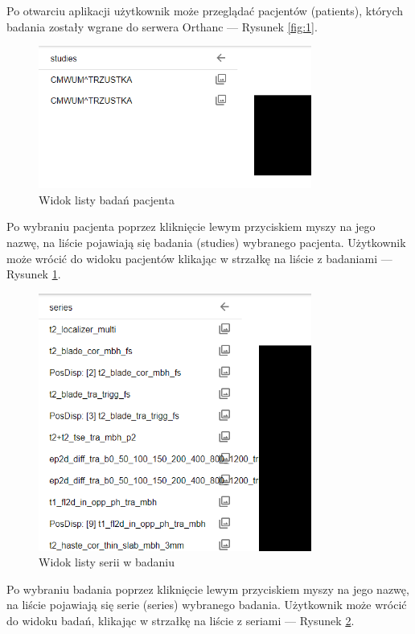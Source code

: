 \documentclass[a4paper,11pt,twoside,openright]{report}
\theoremstyle{definition}
\begin{document}
\begin{enumerate}
Po otwarciu aplikacji użytkownik może przeglądać pacjentów (patients), których
badania zostały wgrane do serwera Orthanc --- Rysunek \ref{fig:1}.

\pagebreak


\begin{figure}[h!]
	\center
	\includegraphics[width=0.8\textwidth]{2}
	\caption{Widok listy badań pacjenta}
    	\label{fig:2}
\end{figure}

Po wybraniu pacjenta poprzez kliknięcie lewym przyciskiem myszy na jego nazwę,
na liście pojawiają się badania (studies) wybranego pacjenta. Użytkownik może
wrócić do widoku pacjentów klikając w strzałkę na liście z badaniami --- Rysunek \ref{fig:2}.

\pagebreak

\begin{figure}[h!]
	\center
	\includegraphics[width=0.8\textwidth]{3}
	\caption{Widok listy serii w badaniu}
    	\label{fig:3}
\end{figure}

Po wybraniu badania poprzez kliknięcie lewym przyciskiem myszy na jego nazwę,
na liście pojawiają się serie (series) wybranego badania. Użytkownik może wrócić
do widoku badań, klikając w strzałkę na liście z seriami --- Rysunek \ref{fig:3}.


\end{enumerate}
\end{document}
